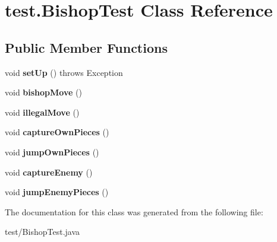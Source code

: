 \hypertarget{classtest_1_1BishopTest}{\section{test.\-Bishop\-Test Class Reference}
\label{classtest_1_1BishopTest}
}
\subsection*{Public Member Functions}
\begin{DoxyCompactItemize}
\item 
\hypertarget{classtest_1_1BishopTest_a58b9802c94c002fd4bb4ac676fd17fda}{void {\bfseries set\-Up} ()  throws Exception }\label{classtest_1_1BishopTest_a58b9802c94c002fd4bb4ac676fd17fda}

\item 
\hypertarget{classtest_1_1BishopTest_a907048258e752fe2419ba11ae7cea221}{void {\bfseries bishop\-Move} ()}\label{classtest_1_1BishopTest_a907048258e752fe2419ba11ae7cea221}

\item 
\hypertarget{classtest_1_1BishopTest_a39b6d5b8258787d4c68c7a88214fc30d}{void {\bfseries illegal\-Move} ()}\label{classtest_1_1BishopTest_a39b6d5b8258787d4c68c7a88214fc30d}

\item 
\hypertarget{classtest_1_1BishopTest_afcc606196bd42595b31a6f3bdf552998}{void {\bfseries capture\-Own\-Pieces} ()}\label{classtest_1_1BishopTest_afcc606196bd42595b31a6f3bdf552998}

\item 
\hypertarget{classtest_1_1BishopTest_aac4d4da8ff982822f541508b8fb970b0}{void {\bfseries jump\-Own\-Pieces} ()}\label{classtest_1_1BishopTest_aac4d4da8ff982822f541508b8fb970b0}

\item 
\hypertarget{classtest_1_1BishopTest_a4c9f847b1ef661b2e099dada3c7b3741}{void {\bfseries capture\-Enemy} ()}\label{classtest_1_1BishopTest_a4c9f847b1ef661b2e099dada3c7b3741}

\item 
\hypertarget{classtest_1_1BishopTest_a635a251082b8150fb91b6eb389965af2}{void {\bfseries jump\-Enemy\-Pieces} ()}\label{classtest_1_1BishopTest_a635a251082b8150fb91b6eb389965af2}

\end{DoxyCompactItemize}


The documentation for this class was generated from the following file\-:\begin{DoxyCompactItemize}
\item 
test/Bishop\-Test.\-java\end{DoxyCompactItemize}
